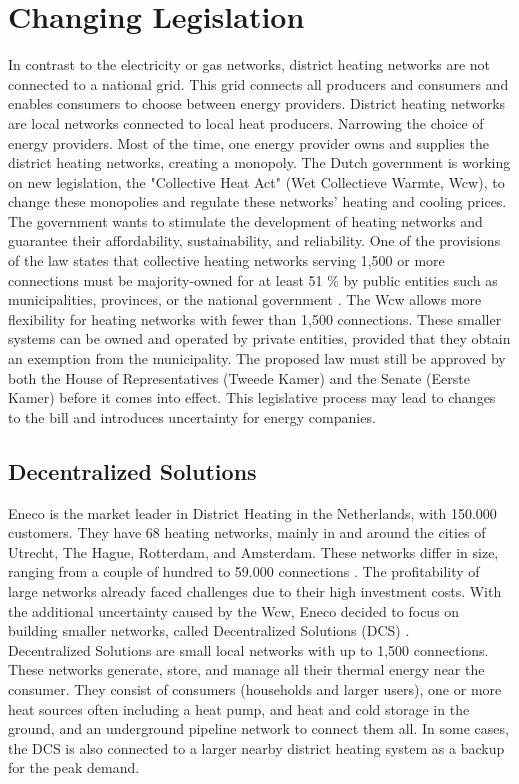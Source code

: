 \section{Changing Legislation}
In contrast to the electricity or gas networks, district heating networks are not connected to a national grid. This grid connects all producers and consumers and enables consumers to choose between energy providers. District heating networks are local networks connected to local heat producers. Narrowing the choice of energy providers. Most of the time, one energy provider owns and supplies the district heating networks, creating a monopoly. The Dutch government is working on new legislation, the "Collective Heat Act" (Wet Collectieve Warmte, Wcw), to change these monopolies and regulate these networks' heating and cooling prices. The government wants to stimulate the development of heating networks and guarantee their affordability, sustainability, and reliability. One of the provisions of the law states that collective heating networks serving 1,500 or more connections must be majority-owned for at least 51 $\%$ by public entities such as municipalities, provinces, or the national government \cite{WcWsite}. The Wcw allows more flexibility for heating networks with fewer than 1,500 connections. These smaller systems can be owned and operated by private entities, provided that they obtain an exemption from the municipality. The proposed law
must still be approved by both the House of Representatives (Tweede Kamer) and the Senate (Eerste Kamer) before it comes into effect. This legislative process may lead to changes to the bill and introduces uncertainty for energy companies.

\subsection{Decentralized Solutions}
Eneco is the market leader in District Heating in the Netherlands, with 150.000 customers. They have 68 heating networks, mainly in and around the cities of Utrecht, The Hague, Rotterdam, and Amsterdam. These networks differ in size, ranging from a couple of hundred to 59.000 connections \cite{warmtenetwerkenEneco}. The profitability of large networks already faced challenges due to their high investment costs. With the additional uncertainty caused by the Wcw, Eneco decided to focus on building smaller networks, called Decentralized Solutions (DCS) \cite{nos2025warmtenetten}. \\

Decentralized Solutions are small local networks with up to 1,500 connections. These networks generate, store, and manage all their thermal energy near the consumer. They consist of consumers (households and larger users), one or more heat sources often including a heat pump, and heat and cold storage in the ground, and an underground pipeline network to connect them all. In some cases, the DCS is also connected to a larger nearby district heating system as a backup for the peak demand.


